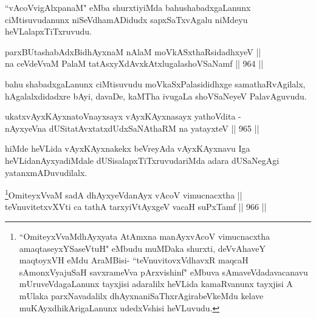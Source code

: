 \begin{artha}
``vAcoVvigAlxpanaM" eMba shurxtiyiMda bahushabadxgaLanunx ciMtisuvudanunx niSeVdhamADidudx sapxSaTxvAgalu niMdeyu heVLalapxTiTxruvudu.
\end{artha}


\begin{shl}
parxBUtashabAdxBidhAyxnaM nAlaM moVkASxthaRsidadhxyeV || \\
na ceVdeVvaM PalaM tatAsxyXdAvxkAtxlugalashoVSaNamf \hfill || 964 ||  
\end{shl}	

\begin{artha}
bahu shabadxgaLanunx ciMtisuvudu moVkaSxPalasididhxge samathaRvAgilalx, hAgalalxdidadxre bAyi, davaDe, kaMTha ivugaLa shoVSaNeyeV PalavAguvudu.
\end{artha}


\begin{shl}
ukatxvAyxKAyxnatoV\s nayxsayx vAyxKAyxnasayx yathoVdita - \\
nAyxyeVna dUSitatAvxtatxdUdxSaNAthaRM na yatayxteV \hfill || 965 ||  
\end{shl}

\begin{artha}
hiMde heVLida vAyxKAyxnakekx beVreyAda vAyxKAyxnavu Iga heVLida\footnotemark[2] nAyxyadiMdale dUSisalapxTiTxruvudariMda adara dUSaNegAgi yatanxmADuvudilalx.
\end{artha}


\begin{shl}
\footnote{``OmiteyxVvaMdhAyxyata AtAmxna manAyxvAcoV vimucnacxtha amaqtaseyxYSaseVtuH" eMbudu muMDaka shurxti, deVvAhaveY maqtoyxVH eMdu AraMBisi- ``teVnuvitovxVdhavxR maqcaH sAmonxVyajuSaH savxrameVva pArxvishinf" eMbuva sAmaveVdadavacanavu mUruveVdagaLanunx tayxjisi adaralilx heVLida kamaRvanunx tayxjisi A mUlaka parxNavadalilx dhAyxnaniSaThxrAgirabeVkeMdu kelave muKAyxdhikArigaLanunx udedxVshisi heVLuvudu.}OmiteyxVvaM sadA dhAyxyeVdanAyx vAcoV vimucnacxtha || \\
teV\s nuvitetxvXVti ca tathA tarxyiVtAyxgeV vacaH suPxTamf \hfill || 966 ||  
\end{shl}

